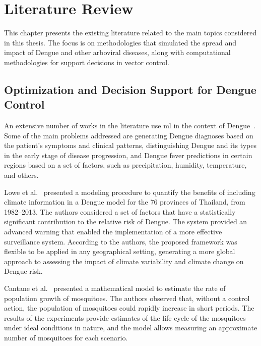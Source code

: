 \chapter{Literature Review}\label{chp:literature-review}

\def\checkmark{\tikz\fill[scale=0.4](0,.35) -- (.25,0) -- (1,.7) -- (.25,.15) --
	cycle;}

This chapter presents the existing literature related to the main topics
considered in this thesis. The focus is on methodologies that simulated the
spread and impact of Dengue and other arboviral diseases, along with
computational methodologies for support decisions in vector control.

\section{Optimization and Decision Support for Dengue Control}\label{sec:optimization-decision-support}

An extensive number of works in the literature use \gls{ml} in the context of
Dengue~\citep{shakurat:2015,shakil:2015,hair:2019,sarma:2020,appice:2020}. Some
of the main problems addressed are generating Dengue diagnoses based on the
patient's symptoms and clinical patterns, distinguishing Dengue and its types in
the early stage of disease progression, and Dengue fever predictions in certain
regions based on a set of factors, such as precipitation, humidity, temperature,
and others.

Lowe et al.~\cite{lowe:2015} presented a modeling procedure to quantify the
benefits of including climate information in a Dengue model for the 76 provinces
of Thailand, from 1982--2013. The authors considered a set of factors that have
a statistically significant contribution to the relative risk of Dengue. The
system provided an advanced warning that enabled the implementation of a more
effective surveillance system. According to the authors, the proposed framework
was flexible to be applied in any geographical setting, generating a more global
approach to assessing the impact of climate variability and climate change on
Dengue risk.

Cantane et al.~\cite{cantane:2015} presented a mathematical model to estimate
the rate of population growth of mosquitoes. The authors observed that, without
a control action, the population of mosquitoes could rapidly increase in short
periods. The results of the experiments provide estimates of the life cycle of
the mosquitoes under ideal conditions in nature, and the model allows measuring
an approximate number of mosquitoes for each scenario.

